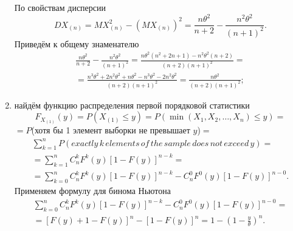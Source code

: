 \begin{enumerate}[label=\alph*)]
По свойствам дисперсии
$$DX_{ \left( n \right) } =
  MX_{ \left( n \right) }^2 - \left( MX_{ \left( n \right) } \right)^2 =
  \frac{n \theta^2}{n + 2} - \frac{n^2 \theta^2}{ \left( n + 1 \right)^2}.$$
Приведём к общему знаменателю
\begin{equation*}
  \begin{split}
    \frac{n \theta^2}{n + 2} - \frac{n^2 \theta^2}{ \left( n + 1 \right)^2} =
    \frac{n \theta^2 \left( n^2 + 2n + 1 \right) - n^2 \theta^2 \left( n + 2 \right) }{ \left( n + 2 \right) \left( n + 1 \right)^2} = \\
    = \frac{n^3 \theta^2 + 2n^2 \theta^2 + n \theta^2 - n^3 \theta^2 - 2n^2 \theta^2}{ \left( n + 2 \right) \left( n + 1 \right)^2} =
    \frac{n \theta^2}{ \left( n + 2 \right) \left( n + 1 \right)^2};
  \end{split}
\end{equation*}
\item найдём функцию распределения первой порядковой статистики
$$F_{X_{ \left( 1 \right) }} \left( y \right) =
  P \left( X_{ \left( 1 \right) } \leq y \right) =
  P \left( \min \left( X_1, X_2, \dotsc, X_n \right) \leq y \right) =$$
  $= P$(хотя бы 1 элемент выборки не превышает $y$)$ =$
\begin{equation*}
  \begin{split}
    \sum \limits_{k = 1}^n
    P \left(exactly \, k \, elements \, of \, the \, sample \, does \, not \, exceed \, y \right) = \\
    = \sum \limits_{k = 1}^n C_n^k F^k \left( y \right) \left[ 1 - F \left( y \right) \right]^{n - k} = \\
    = \sum \limits_{k = 0}^n
      C_n^k F^k \left( y \right) \left[ 1 - F \left( y \right) \right]^{n - k} -
    C_n^0 F^0 \left( y \right) \left[ 1 - F \left( y \right) \right]^{n - 0}.
  \end{split}
\end{equation*}
Применяем формулу для бинома Ньютона
\begin{equation*}
  \begin{split}
    \sum \limits_{k = 0}^n
    C_n^k F^k \left( y \right) \left[ 1 - F \left( y \right) \right]^{n - k} -
    C_n^0 F^0 \left( y \right) \left[ 1 - F \left( y \right) \right]^{n - 0} = \\
    = \left[ F \left( y \right) + 1 - F \left( y \right) \right]^n -
    \left[ 1 - F \left( y \right) \right]^n =
    1 - \left( 1 - \frac{y}{ \theta } \right)^n.
  \end{split}
\end{equation*}


\end{enumerate}
